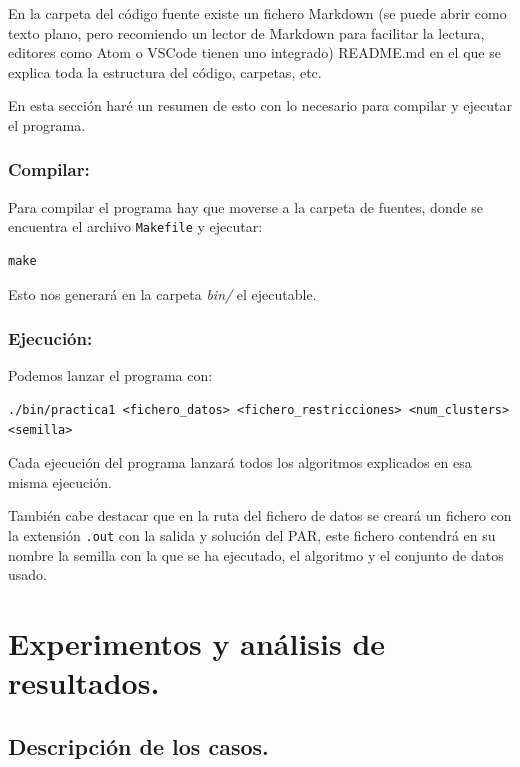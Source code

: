 \documentclass[12pt, spanish]{article}
\begin{document}
En la carpeta del código fuente existe un fichero Markdown (se puede abrir como texto plano, pero recomiendo un lector de Markdown para facilitar la lectura, editores como Atom o VSCode tienen uno integrado) README.md en el que se explica toda la estructura del código, carpetas, etc.

En esta sección haré un resumen de esto con lo necesario para compilar y ejecutar el programa.

\subsubsection{Compilar:}

Para compilar el programa hay que moverse a la carpeta de fuentes, donde se encuentra el archivo \texttt{Makefile} y ejecutar:

\begin{lstlisting}
make
\end{lstlisting}

Esto nos generará en la carpeta \textit{bin/} el ejecutable.


\subsubsection{Ejecución:}

Podemos lanzar el programa con:

\begin{lstlisting}
./bin/practica1 <fichero_datos> <fichero_restricciones> <num_clusters> <semilla>
\end{lstlisting}

Cada ejecución del programa lanzará todos los algoritmos explicados en esa misma ejecución.

También cabe destacar que en la ruta del fichero de datos se creará un fichero con la extensión \texttt{.out} con la salida y solución del PAR, este fichero contendrá en su nombre la semilla con la que se ha ejecutado, el algoritmo y el conjunto de datos usado.


\newpage

\section{Experimentos y análisis de resultados.}


\subsection{Descripción de los casos.}
\end{document}

